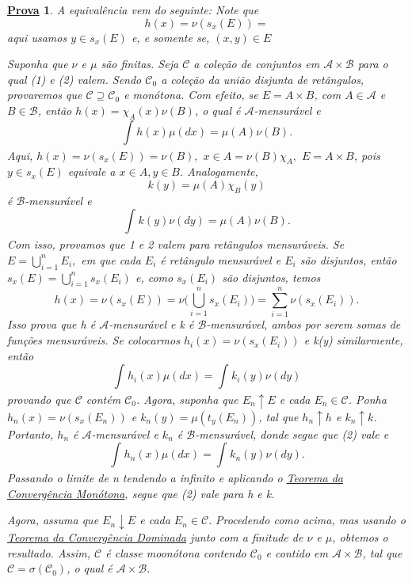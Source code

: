 \documentclass{article}
\newtheorem*{proof*}{\underline{Prova}}
\begin{document}
 \begin{proof*}
   A equivalência vem do seguinte: Note que 
     \[
       h(x) = \nu(s_x(E)) =
     \]
     aqui usamos \(y\in s_x(E)\) e, e somente se, \((x, y)\in E\) 

    Suponha que \(\nu\) e \(\mu \) são finitas. Seja \(\mathcal{C}\) a coleção de conjuntos em \(\mathcal{A}\times \mathcal{B}\) para o qual (1)
  e (2) valem. Sendo \(\mathcal{C}_{0}\) a coleção da união disjunta de retângulos, provaremos que \(\mathcal{C}\supseteq \mathcal{C}_{0}\) e monótona. 
  Com efeito, se \(E = A\times B\), com \(A\in \mathcal{A}\) e \(B\in \mathcal{B}\), então \(h(x) = \chi_{A}(x)\nu(B)\), o qual é \(\mathcal{A}\)-mensurável e 
    \[
      \int_{}h(x) \mu (dx) = \mu (A)\nu(B).
    \]
  Aqui, \(h(x) = \nu(s_x(E)) = \nu(B),\) \(x\in A = \nu(B)\chi_{A},\) \(E = A\times B\), pois \(y\in s_x(E) \) equivale a \(x\in  A, y\in B\). Analogamente, 
    \[
      k(y) = \mu (A)\chi_{B}(y)
    \]
  é \(\mathcal{B}\)-mensurável e 
    \[
      \int_{}k(y)\nu( dy) = \mu (A)\nu(B).
    \]
  Com isso, provamos que 1 e 2 valem para retângulos mensuráveis. Se \(E = \bigcup_{i=1}^{n}E_{i},\) em que cada \(E_{i}\) é retângulo mensurável e \(E_{i}\) são disjuntos, então \(s_x(E) = \bigcup_{i=1}^{n}s_x(E_{i})\)
e, como \(s_x(E_{i})\) são disjuntos, temos 
  \[
    h(x) = \nu(s_x(E)) = \nu \biggl(\bigcup_{i=1}^{n}s_x(E_{i})\biggr) = \sum\limits_{i=1}^{n}\nu(s_x(E_{i})).
  \]
  Isso prova que h é \(\mathcal{A}\)-mensurável e k é \(\mathcal{B}\)-mensurável, ambos por serem somas de funções mensuráveis. Se colocarmos \(h_{i}(x) = \nu(s_x(E_{i}))\) e k(y) similarmente, então 
    \[
      \int_{}h_{i}(x)\mu ( dx) = \int_{}k_{i}(y)\nu( dy)
    \]
  provando que \(\mathcal{C}\) contém \(\mathcal{C}_{0}\). Agora, suponha que \(E_{n}\uparrow E\) e cada \(E_{n}\in \mathcal{C}\). Ponha \(h_{n}(x) = \nu(s_x(E_{n}))\) e \(k_{n}(y) = \mu (t_y(E_{n}))\), tal que 
  \(h_{n}\uparrow h\) e \(k_{n}\uparrow k\). Portanto, \(h_{n}\) é \(\mathcal{A}\)-mensurável e \(k_{n}\) é \(\mathcal{B}\)-mensurável, donde segue que (2) vale e 
    \[
      \int_{}h_{n}(x)\mu ( dx) = \int_{}k_{n}(y)\nu( dy).
    \]
  Passando o limite de n tendendo a infinito e aplicando o \hyperlink{monotone_convergence}{\textit{Teorema da Convergência Monótona}}, segue que (2) vale para h e k. 

  Agora, assuma que \(E_{n}\downarrow E\) e cada \(E_{n}\in \mathcal{C}.\) Procedendo como acima, mas usando o \hyperlink{dominated_convergence}{\textit{Teorema da Convergência Dominada}} junto com a finitude de \(\nu\) e \(\mu \), obtemos o resultado. 
Assim, \(\mathcal{C}\) é classe moonótona contendo \(\mathcal{C}_{0}\) e contido em \(\mathcal{A}\times \mathcal{B}\), tal que \(\mathcal{C} = \sigma (\mathcal{C}_{0})\), o qual é \(\mathcal{A}\times \mathcal{B}.\)


\end{proof*}
\end{document}
